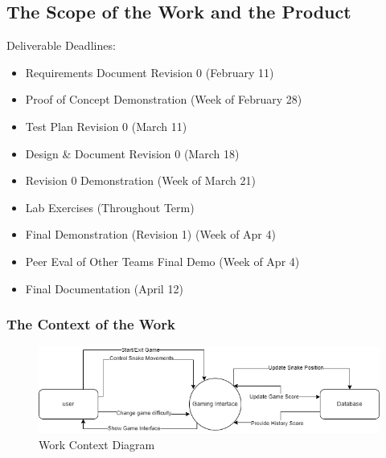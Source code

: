 \documentclass[12pt, titlepage]{article}
\begin{document}
\subsection{The Scope of the Work and the Product}
Deliverable Deadlines:
    	\begin{itemize}
    		\item Requirements Document Revision 0      (February 11)
    		\item Proof of Concept Demonstration        (Week of February 28)
    		\item Test Plan Revision 0        		    (March 11)
    		\item Design \& Document Revision 0          (March 18)
    		\item Revision 0 Demonstration              (Week of March 21)
    		\item Lab Exercises				            (Throughout Term)
    		\item Final Demonstration (Revision 1)	    (Week of Apr 4)
    		\item Peer Eval of Other Teams Final Demo   (Week of Apr 4)
    		\item Final Documentation				    (April 12)
    	\end{itemize}


\subsubsection{The Context of the Work}
\begin{figure}[!htbp]
    \centering
    \includegraphics[scale = 0.55]{Figures/context_of_work.png}
    \caption{Work Context Diagram}
\end{figure}
\end{document}
